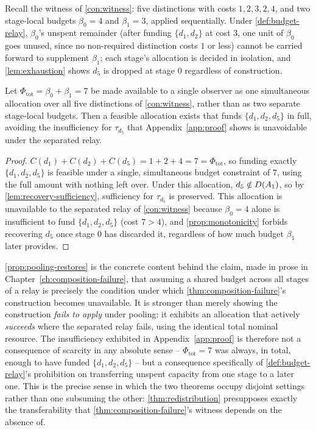 Recall the witness of \cref{con:witness}: five distinctions with costs
$1,2,3,2,4$, and two stage-local budgets $\beta_0 = 4$ and $\beta_1 = 3$,
applied sequentially. Under \cref{def:budget-relay}, $\beta_0$'s unspent
remainder (after funding $\{d_1, d_2\}$ at cost $3$, one unit of $\beta_0$
goes unused, since no non-required distinction costs $1$ or less) cannot
be carried forward to supplement $\beta_1$; each stage's allocation is
decided in isolation, and \cref{lem:exhaustion} shows $d_5$ is dropped at
stage $0$ regardless of construction.

\begin{proposition}
\label{prop:pooling-restores}
Let $\Phi_{\mathrm{tot}} = \beta_0 + \beta_1 = 7$ be made available to a
single observer as one simultaneous allocation over all five distinctions
of \cref{con:witness}, rather than as two separate stage-local budgets.
Then a feasible allocation exists that funds $\{d_1, d_2, d_5\}$ in full,
avoiding the insufficiency for $\tau_{d_5}$ that
Appendix~\ref{app:proof} shows is unavoidable under the separated relay.
\end{proposition}

\begin{proof}
$C(d_1) + C(d_2) + C(d_5) = 1 + 2 + 4 = 7 = \Phi_{\mathrm{tot}}$, so
funding exactly $\{d_1, d_2, d_5\}$ is feasible under a single,
simultaneous budget constraint of $7$, using the full amount with nothing
left over. Under this allocation, $d_5 \notin D(A_1)$, so by
\cref{lem:recovery-sufficiency}, sufficiency for $\tau_{d_5}$ is
preserved. This allocation is unavailable to the separated relay of
\cref{con:witness} because $\beta_0 = 4$ alone is insufficient to fund
$\{d_1, d_2, d_5\}$ (cost $7 > 4$), and \cref{prop:monotonicity} forbids
recovering $d_5$ once stage $0$ has discarded it, regardless of how much
budget $\beta_1$ later provides.
\end{proof}

\cref{prop:pooling-restores} is the concrete content behind the claim,
made in prose in Chapter~\ref{ch:composition-failure}, that assuming a
shared budget across all stages of a relay is precisely the condition
under which \cref{thm:composition-failure}'s construction becomes
unavailable. It is stronger than merely showing the construction
\emph{fails to apply} under pooling: it exhibits an allocation that
actively \emph{succeeds} where the separated relay fails, using the
identical total nominal resource. The insufficiency exhibited in
Appendix~\ref{app:proof} is therefore not a consequence of scarcity in
any absolute sense -- $\Phi_{\mathrm{tot}} = 7$ was always, in total,
enough to have funded $\{d_1, d_2, d_5\}$ -- but a consequence
specifically of \cref{def:budget-relay}'s prohibition on transferring
unspent capacity from one stage to a later one. This is the precise
sense in which the two theorems occupy disjoint settings rather than one
subsuming the other: \cref{thm:redistribution} presupposes exactly the
transferability that \cref{thm:composition-failure}'s witness depends on
the absence of.
